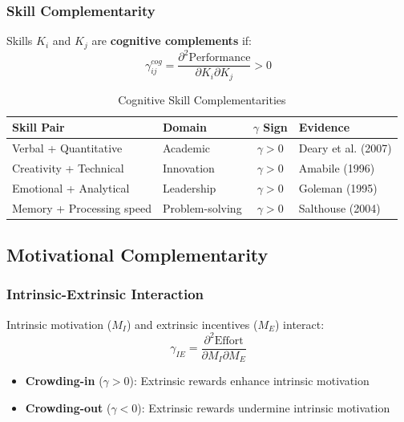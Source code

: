 \subsubsection{Skill Complementarity}

\begin{definition}
Skills $K_i$ and $K_j$ are \textbf{cognitive complements} if:
\begin{equation}
\gamma^{cog}_{ij} = \frac{\partial^2 \text{Performance}}{\partial K_i \partial K_j} > 0
\end{equation}
\end{definition}

\begin{table}[h]
\centering
\caption{Cognitive Skill Complementarities}
\label{tab:cognitive-gamma}
\renewcommand{\arraystretch}{1.2}
\begin{tabular}{@{}llcl@{}}
\toprule
\textbf{Skill Pair} & \textbf{Domain} & \textbf{$\gamma$ Sign} & \textbf{Evidence} \\
\midrule
Verbal + Quantitative & Academic & $\gamma > 0$ & Deary et al. (2007) \\
Creativity + Technical & Innovation & $\gamma > 0$ & Amabile (1996) \\
Emotional + Analytical & Leadership & $\gamma > 0$ & Goleman (1995) \\
Memory + Processing speed & Problem-solving & $\gamma > 0$ & Salthouse (2004) \\
\bottomrule
\end{tabular}
\end{table}

\subsection{Motivational Complementarity}

\subsubsection{Intrinsic-Extrinsic Interaction}

\begin{theorem}
Intrinsic motivation ($M_I$) and extrinsic incentives ($M_E$) interact:
\begin{equation}
\gamma_{IE} = \frac{\partial^2 \text{Effort}}{\partial M_I \partial M_E}
\end{equation}
\begin{itemize}
    \item \textbf{Crowding-in} ($\gamma > 0$): Extrinsic rewards enhance intrinsic motivation
    \item \textbf{Crowding-out} ($\gamma < 0$): Extrinsic rewards undermine intrinsic motivation
\end{itemize}
\end{theorem}

